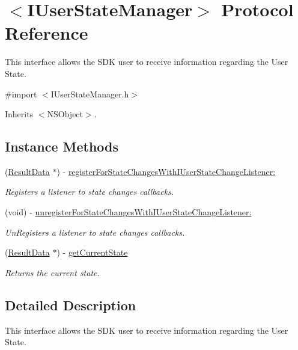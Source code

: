 \hypertarget{protocol_i_user_state_manager-p}{}\section{$<$I\+User\+State\+Manager$>$ Protocol Reference}
\label{protocol_i_user_state_manager-p}


This interface allows the S\+D\+K user to receive information regarding the User State.  




{\ttfamily \#import $<$I\+User\+State\+Manager.\+h$>$}



Inherits $<$\+N\+S\+Object$>$.

\subsection*{Instance Methods}
\begin{DoxyCompactItemize}
\item 
(\hyperlink{interface_result_data}{Result\+Data} $\ast$) -\/ \hyperlink{protocol_i_user_state_manager-p_a8638dedec19c8a392ee91b2d499eba42}{register\+For\+State\+Changes\+With\+I\+User\+State\+Change\+Listener\+:}
\begin{DoxyCompactList}\small\item\em Registers a listener to state changes callbacks. \end{DoxyCompactList}\item 
(void) -\/ \hyperlink{protocol_i_user_state_manager-p_ac0beb0f14d28732dd07ce64d9e22ad23}{unregister\+For\+State\+Changes\+With\+I\+User\+State\+Change\+Listener\+:}
\begin{DoxyCompactList}\small\item\em Un\+Registers a listener to state changes callbacks. \end{DoxyCompactList}\item 
(\hyperlink{interface_result_data}{Result\+Data} $\ast$) -\/ \hyperlink{protocol_i_user_state_manager-p_afe9e6b8eee7b6ad9eeb50b88f0d97f47}{get\+Current\+State}
\begin{DoxyCompactList}\small\item\em Returns the current state. \end{DoxyCompactList}\end{DoxyCompactItemize}


\subsection{Detailed Description}
This interface allows the S\+D\+K user to receive information regarding the User State. 

